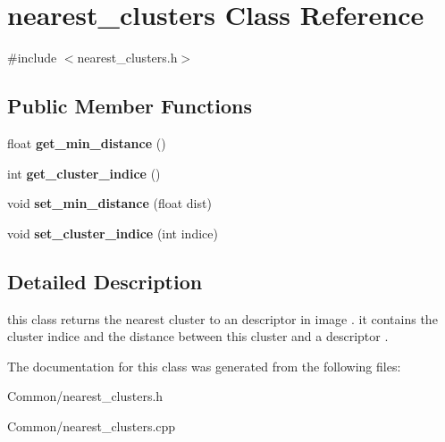 \hypertarget{classnearest__clusters}{
\section{nearest\_\-clusters Class Reference}
\label{classnearest__clusters}
}


{\ttfamily \#include $<$nearest\_\-clusters.h$>$}

\subsection*{Public Member Functions}
\begin{DoxyCompactItemize}
\item 
\hypertarget{classnearest__clusters_a298d3368dd7ac1c04cd5633e787ce805}{
float {\bfseries get\_\-min\_\-distance} ()}
\label{classnearest__clusters_a298d3368dd7ac1c04cd5633e787ce805}

\item 
\hypertarget{classnearest__clusters_a6eb34bc7bd40596ca09687a044180507}{
int {\bfseries get\_\-cluster\_\-indice} ()}
\label{classnearest__clusters_a6eb34bc7bd40596ca09687a044180507}

\item 
\hypertarget{classnearest__clusters_ae01d3e8205e65ed4a2f6ed814af245fd}{
void {\bfseries set\_\-min\_\-distance} (float dist)}
\label{classnearest__clusters_ae01d3e8205e65ed4a2f6ed814af245fd}

\item 
\hypertarget{classnearest__clusters_a70851b86b6d6208c920a06367d60a48c}{
void {\bfseries set\_\-cluster\_\-indice} (int indice)}
\label{classnearest__clusters_a70851b86b6d6208c920a06367d60a48c}

\end{DoxyCompactItemize}


\subsection{Detailed Description}
this class returns the nearest cluster to an descriptor in image . it contains the cluster indice and the distance between this cluster and a descriptor . 

The documentation for this class was generated from the following files:\begin{DoxyCompactItemize}
\item 
Common/nearest\_\-clusters.h\item 
Common/nearest\_\-clusters.cpp\end{DoxyCompactItemize}
